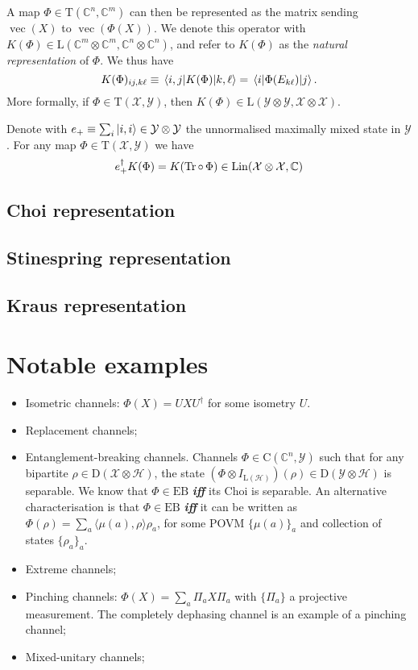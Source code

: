 \documentclass[a4paper]{report}
\newcommand{\CC}{\mathbb{C}}
\newcommand{\on}[1]{\operatorname{#1}}
\newcommand{\calH}{{\mathcal{H}}}
\newcommand{\calY}{{\mathcal{Y}}}
\newcommand{\calX}{{\mathcal{X}}}
\newcommand{\rmC}{{\mathrm{C}}}
\newcommand{\rmD}{{\mathrm{D}}}
\newcommand{\rmL}{{\mathrm{L}}}
\newcommand{\rmT}{{\mathrm{T}}}
\DeclareMathOperator{\Lin}{Lin}
\begin{document}
A map $\Phi\in\rmT(\CC^n,\CC^m)$ can then be represented as the matrix sending $\on{vec}(X)$ to $\on{vec}(\Phi(X))$. We denote this operator with $K(\Phi)\in\rmL(\CC^m\otimes\CC^m,\CC^n\otimes\CC^n)$, and refer to $K(\Phi)$ as the \emph{natural representation} of $\Phi$.
We thus have
\begin{equation}
	K(\Phi)_{ij,k\ell}
	\equiv \mel{i,j}{K(\Phi)}{k,\ell}
	= \mel{i}{\Phi(E_{k\ell})}{j}.
\end{equation}
More formally, if $\Phi\in\rmT(\calX,\calY)$, then $K(\Phi)\in\rmL(\calY\otimes\calY,\calX\otimes\calX)$.

\begin{prop}
	Denote with $e_+\equiv \sum_i \ket{i,i}\in\calY\otimes\calY$ the unnormalised maximally mixed state in $\calY$.
	For any map $\Phi\in\rmT(\calX,\calY)$ we have
	\begin{equation}
		e_+^\dagger K(\Phi) = K(\Tr\circ\, \Phi) \in \Lin(\calX\otimes\calX,\CC)
	\end{equation}
\end{prop}

\subsection{Choi representation}

\subsection{Stinespring representation}

\subsection{Kraus representation}

\section{Notable examples}

\begin{itemize}
	\item Isometric channels: $\Phi(X)=UXU^\dagger$ for some isometry $U$.
	\item Replacement channels;
	\item Entanglement-breaking channels. Channels $\Phi\in\rmC(\CC^n,\calY)$ such that for any bipartite $\rho\in\rmD(\calX\otimes\calH)$, the state $(\Phi\otimes I_{\rmL(\calH)})(\rho)\in\rmD(\calY\otimes\calH)$ is separable. We know that $\Phi\in\mathrm{EB}$ \emph{\textbf{iff}} its Choi is separable.
	An alternative characterisation is that $\Phi\in\mathrm{EB}$ \emph{\textbf{iff}} it can be written as $\Phi(\rho)=\sum_a \langle \mu(a),\rho\rangle \rho_a$, for some POVM $\{\mu(a)\}_a$ and collection of states $\{\rho_a\}_a$.
	\item Extreme channels;
	\item Pinching channels: $\Phi(X) =\sum_a \Pi_a X\Pi_a$ with $\{\Pi_a\}$ a projective measurement. The completely dephasing channel is an example of a pinching channel;
	\item Mixed-unitary channels;
\end{itemize}
\end{document}
